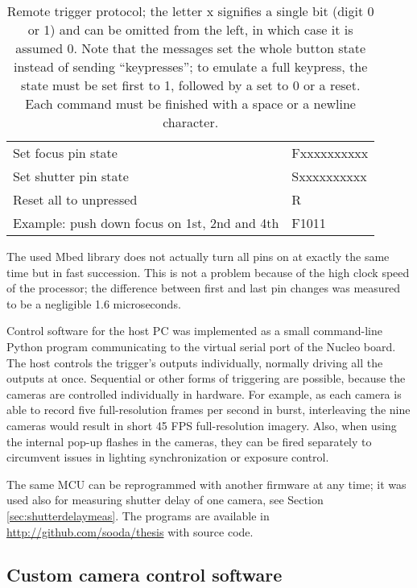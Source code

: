\begin{table}[t]
	\centering
	\begin{tabular}{l l}
		Set focus pin state & Fxxxxxxxxxx\\
		Set shutter pin state & Sxxxxxxxxxx\\
		Reset all to unpressed & R\\
		Example: push down focus on 1st, 2nd and 4th & F1011\\
	\end{tabular}
	\caption{
		Remote trigger protocol; the letter x signifies a single bit (digit 0 or 1) and can be omitted from the left, in which case it is assumed 0.
		Note that the messages set the whole button state instead of sending ``keypresses'';
		to emulate a full keypress, the state must be set first to 1, followed by a set to 0 or a reset.
		Each command must be finished with a space or a newline character.
	}
	\label{tab:triggerprotocol}
\end{table}

The used Mbed library does not actually turn all pins on at exactly the same time but in fast succession.
This is not a problem because of the high clock speed of the processor;
the difference between first and last pin changes was measured to be a negligible 1.6 microseconds.

Control software for the host PC was implemented as a small command-line Python program communicating to the virtual serial port of the Nucleo board.
The host controls the trigger's outputs individually, normally driving all the outputs at once.
Sequential or other forms of triggering are possible, because the cameras are controlled individually in hardware.
For example, as each camera is able to record five full-resolution frames per second in burst, interleaving the nine cameras would result in short 45 FPS full-resolution imagery.
Also, when using the internal pop-up flashes in the cameras, they can be fired separately to circumvent issues in lighting synchronization or exposure control.

The same MCU can be reprogrammed with another firmware at any time; it was used also for measuring shutter delay of one camera, see Section \ref{sec:shutterdelaymeas}.
The programs are available in \url {http://github.com/sooda/thesis} with source code.


\subsection{Custom camera control software} %

